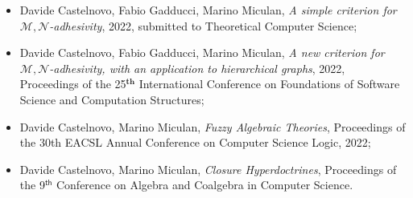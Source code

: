 \documentclass[11pt,a4paper,sans]{moderncv} %
\begin{document}
\begin{itemize}
	\item Davide Castelnovo, Fabio Gadducci, Marino Miculan, \emph{A simple criterion for $\mathcal{M, N}$-adhesivity}, 2022, submitted to Theoretical Computer Science;
	\item Davide Castelnovo, Fabio Gadducci, Marino Miculan, \emph{A new criterion for $\mathcal{M, N}$-adhesivity, with an application to hierarchical graphs}, 2022, Proceedings of	 the 25$^{\mathbf{th}}$ International Conference on Foundations of Software Science and Computation Structures;
	\item Davide Castelnovo, Marino Miculan, \emph{Fuzzy Algebraic Theories},
	 Proceedings of the 30th EACSL Annual Conference on Computer Science Logic, 2022;
	\item Davide Castelnovo, Marino Miculan, \emph{Closure Hyperdoctrines},
		Proceedings of the 9$^{\mathsf{th}}$ Conference on Algebra and Coalgebra in Computer Science.
\end{itemize}








\end{document}
